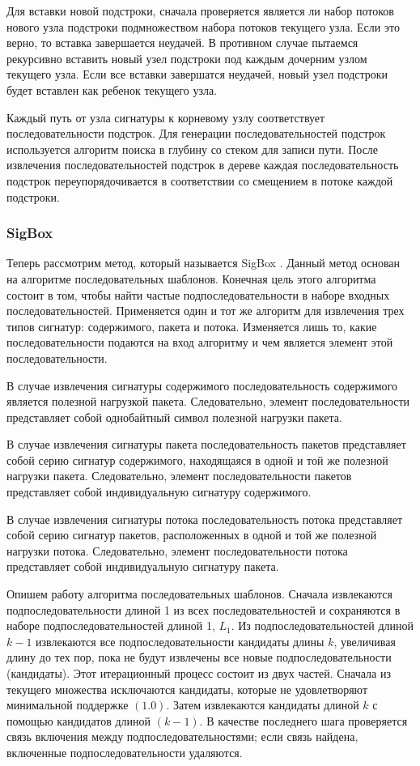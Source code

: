 Для вставки новой подстроки, сначала проверяется является ли набор потоков нового узла подстроки
подмножеством набора потоков текущего узла. Если это верно, то вставка завершается неудачей.
В противном случае пытаемся рекурсивно вставить новый узел подстроки под каждым дочерним узлом текущего узла.
Если все вставки завершатся неудачей, новый узел подстроки будет вставлен как ребенок текущего узла.

Каждый путь от узла сигнатуры к корневому узлу соответствует последовательности подстрок.
Для генерации последовательностей подстрок используется алгоритм поиска в глубину со стеком для записи пути.
После извлечения последовательностей подстрок в дереве каждая последовательность подстрок
переупорядочивается в соответствии со смещением в потоке каждой подстроки.

\subsubsection{SigBox}

Теперь рассмотрим метод, который называется SigBox \cite{shim2017sigbox}. Данный метод основан на алгоритме последовательных шаблонов.
Конечная цель этого алгоритма состоит в том, чтобы найти частые подпоследовательности в наборе входных последовательностей.
Применяется один и тот же алгоритм для извлечения трех типов сигнатур: содержимого, пакета и потока. Изменяется лишь то, какие последовательности
подаются на вход алгоритму и чем является элемент этой последовательности.

В случае извлечения сигнатуры содержимого последовательность содержимого является полезной нагрузкой пакета.
Следовательно, элемент последовательности представляет собой однобайтный символ полезной нагрузки пакета.

В случае извлечения сигнатуры пакета последовательность пакетов представляет собой серию сигнатур содержимого, находящаяся в одной и той же полезной нагрузки пакета.
Следовательно, элемент последовательности пакетов представляет собой индивидуальную сигнатуру содержимого.

В случае извлечения сигнатуры потока последовательность потока представляет собой серию сигнатур пакетов, расположенных в одной и той же полезной нагрузки потока.
Следовательно, элемент последовательности потока представляет собой индивидуальную сигнатуру пакета.

Опишем работу алгоритма последовательных шаблонов.
Сначала извлекаются подпоследовательности длиной 1 из всех последовательностей и сохраняются в наборе подпоследовательностей длиной 1, $L_1$.
Из подпоследовательностей длиной $k-1$ извлекаются все подпоследовательности кандидаты длины $k$,
увеличивая длину до тех пор, пока не будут извлечены все новые подпоследовательности (кандидаты).
Этот итерационный процесс состоит из двух частей.
Сначала из текущего множества исключаются кандидаты, которые не удовлетворяют минимальной поддержке $(1.0)$.
Затем извлекаются кандидаты длиной $k$ с помощью кандидатов длиной $(k-1)$.
В качестве последнего шага проверяется связь включения между подпоследовательностями; если связь найдена, включенные подпоследовательности удаляются.


